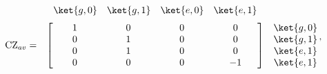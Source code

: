 \documentclass[a4paper,11pt]{article} %
\begin{document}
\begin{equation*} \label{ec_ions_CZav}
 \begin{matrix}
    & 
    \begin{matrix}
      \ket{g,0} & 
      \ket{g,1} & 
      \ket{e,0} &
      \ket{e,1}
    \end{matrix} 	&  \\[.5\normalbaselineskip]
    \text{CZ}_{av} = & 
    \begin{bmatrix}
        \makebox[\widthof{$\ket{g,0}$}]{$1$} & 
        \makebox[\widthof{$\ket{g,0}$}]{$0$} & 
        \makebox[\widthof{$\ket{g,0}$}]{$0$} & 
        \makebox[\widthof{$\ket{g,0}$}]{$0$} \\
        \makebox[\widthof{$\ket{g,0}$}]{$0$} & 
        \makebox[\widthof{$\ket{g,0}$}]{$1$} & 
        \makebox[\widthof{$\ket{g,0}$}]{$0$} & 
        \makebox[\widthof{$\ket{g,0}$}]{$0$} \\
        \makebox[\widthof{$\ket{g,0}$}]{$0$} & 
        \makebox[\widthof{$\ket{g,0}$}]{$1$} & 
        \makebox[\widthof{$\ket{g,0}$}]{$0$} & 
        \makebox[\widthof{$\ket{g,0}$}]{$0$} \\
        \makebox[\widthof{$\ket{g,0}$}]{$0$} & 
        \makebox[\widthof{$\ket{g,0}$}]{$0$} & 
        \makebox[\widthof{$\ket{g,0}$}]{$0$} & 
        \makebox[\widthof{$\ket{g,0}$}]{$-1$} \\
    \end{bmatrix} &
    \begin{matrix} \ket{g,0} \\ \ket{g,1} \\ \ket{e,1} \\ \ket{e,1}  \end{matrix} 
\end{matrix} \,,
\end{equation*}
\end{document}
